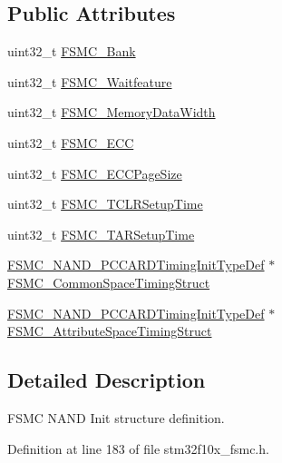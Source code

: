 \subsection*{Public Attributes}
\begin{DoxyCompactItemize}
\item 
uint32\+\_\+t \hyperlink{struct_f_s_m_c___n_a_n_d_init_type_def_a60d3ead2188e1dbdf06810e952b3ce0f}{F\+S\+M\+C\+\_\+\+Bank}
\item 
uint32\+\_\+t \hyperlink{struct_f_s_m_c___n_a_n_d_init_type_def_ab350e15014c4a9f4b2c2f2848f11eeca}{F\+S\+M\+C\+\_\+\+Waitfeature}
\item 
uint32\+\_\+t \hyperlink{struct_f_s_m_c___n_a_n_d_init_type_def_ab4a4f56aab3150d8fb02aaf092db0235}{F\+S\+M\+C\+\_\+\+Memory\+Data\+Width}
\item 
uint32\+\_\+t \hyperlink{struct_f_s_m_c___n_a_n_d_init_type_def_a58d0510c0ce0ae3d1e3863bf8f571377}{F\+S\+M\+C\+\_\+\+E\+CC}
\item 
uint32\+\_\+t \hyperlink{struct_f_s_m_c___n_a_n_d_init_type_def_a7ed6a25710ba724a7a8f90af60130cf6}{F\+S\+M\+C\+\_\+\+E\+C\+C\+Page\+Size}
\item 
uint32\+\_\+t \hyperlink{struct_f_s_m_c___n_a_n_d_init_type_def_a633c7be46a1d281916b9f2e34fa3d36a}{F\+S\+M\+C\+\_\+\+T\+C\+L\+R\+Setup\+Time}
\item 
uint32\+\_\+t \hyperlink{struct_f_s_m_c___n_a_n_d_init_type_def_a014c1b8977b454ac15654d93dbb7dff9}{F\+S\+M\+C\+\_\+\+T\+A\+R\+Setup\+Time}
\item 
\hyperlink{struct_f_s_m_c___n_a_n_d___p_c_c_a_r_d_timing_init_type_def}{F\+S\+M\+C\+\_\+\+N\+A\+N\+D\+\_\+\+P\+C\+C\+A\+R\+D\+Timing\+Init\+Type\+Def} $\ast$ \hyperlink{struct_f_s_m_c___n_a_n_d_init_type_def_a7ab117a15e780c02fcad5d844e71c425}{F\+S\+M\+C\+\_\+\+Common\+Space\+Timing\+Struct}
\item 
\hyperlink{struct_f_s_m_c___n_a_n_d___p_c_c_a_r_d_timing_init_type_def}{F\+S\+M\+C\+\_\+\+N\+A\+N\+D\+\_\+\+P\+C\+C\+A\+R\+D\+Timing\+Init\+Type\+Def} $\ast$ \hyperlink{struct_f_s_m_c___n_a_n_d_init_type_def_a2a33bd855240dba37e507f223dbca062}{F\+S\+M\+C\+\_\+\+Attribute\+Space\+Timing\+Struct}
\end{DoxyCompactItemize}


\subsection{Detailed Description}
F\+S\+MC N\+A\+ND Init structure definition. 

Definition at line 183 of file stm32f10x\+\_\+fsmc.\+h.



